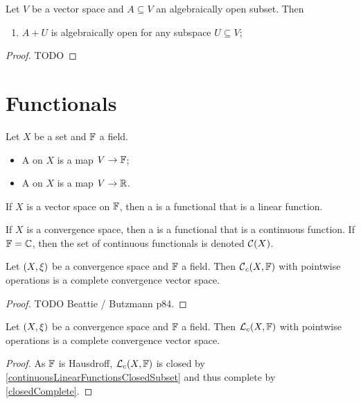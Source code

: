 \begin{proposition} \label{algebraicallyOpen}
Let $V$ be a vector space and $A \subseteq V$ an algebraically open subset. Then
\begin{enumerate}
\item $A+U$ is algebraically open for any subspace $U\subseteq V$;
\end{enumerate}
\end{proposition}
\begin{proof}
TODO
\end{proof}




\chapter{Functionals}
\begin{definition}
Let $X$ be a set and $\mathbb{F}$ a field.
\begin{itemize}
\item A  on $X$ is a map $V\to \mathbb{F}$;
\item A  on $X$ is a map $V\to \mathbb{R}$.
\end{itemize}
If $X$ is a vector space on $\mathbb{F}$, then a  is a functional that is a linear function.

If $X$ is a convergence space, then a  is a functional that is a continuous function.
If $\mathbb{F} = \mathbb{C}$, then the set of continuous functionals is denoted $\operatorname{\mathcal{C}}(X)$.
\end{definition}

\begin{proposition}
Let $\left( X, \xi \right)$ be a convergence space and $\mathbb{F}$ a field. Then $\operatorname{\mathcal{C}}_c(X, \mathbb{F})$ with pointwise operations is a complete convergence vector space.
\end{proposition}
\begin{proof}
TODO Beattie / Butzmann p84.
\end{proof}
\begin{corollary}
Let $\left( X, \xi \right)$ be a convergence space and $\mathbb{F}$ a field. Then $\operatorname{\mathcal{L}}_c(X, \mathbb{F})$ with pointwise operations is a complete convergence vector space.
\end{corollary}
\begin{proof}
As $\mathbb{F}$ is Hausdroff, $\operatorname{\mathcal{L}}_c(X, \mathbb{F})$ is closed by \ref{continuousLinearFunctionsClosedSubset} and thus complete by \ref{closedComplete}.
\end{proof}

